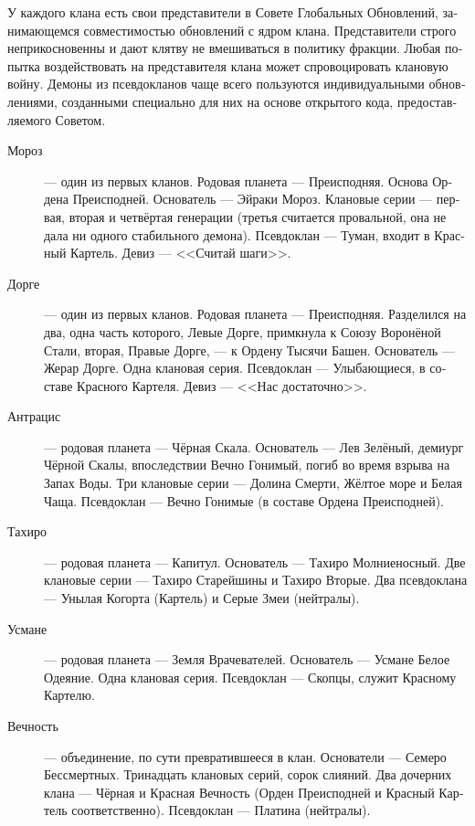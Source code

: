\documentclass[a4paper,12pt,fleqn]{book}\usepackage{cooltooltips}\usepackage{polyglossia}\setdefaultlanguage[babelshorthands=true]{russian}\setotherlanguage{english}\defaultfontfeatures{Ligatures=TeX,Mapping=tex-text} \usepackage{xcolor}\definecolor{lightgray}{HTML}{bbbbbb}\color{lightgray}\newcommand{\ml}[3]{\textenglish{\textcolor{black}{#3}}}
\begin{document}
{У каждого клана есть свои представители в Совете Глобальных Обновлений, занимающемся совместимостью обновлений с ядром клана.
Представители строго неприкосновенны и дают клятву не вмешиваться в политику фракции.
Любая попытка воздействовать на представителя клана может спровоцировать клановую войну.
Демоны из псевдокланов чаще всего пользуются индивидуальными обновлениями, созданными специально для них на основе открытого кода, предоставляемого Советом.

\begin{description}

\item[Мороз] --- один из первых кланов.
Родовая планета --- Преисподняя.
Основа Ордена Преисподней.
Основатель --- Эйраки Мороз.
Клановые серии --- первая, вторая и четвёртая генерации (третья считается провальной, она не дала ни одного стабильного демона).
Псевдоклан --- Туман, входит в Красный Картель.
Девиз --- <<Считай шаги>>.

\item[Дорге] --- один из первых кланов.
Родовая планета --- Преисподняя.
Разделился на два, одна часть которого, Левые Дорге, примкнула к Союзу Воронёной Стали, вторая, Правые Дорге, --- к Ордену Тысячи Башен.
Основатель --- Жерар Дорге.
Одна клановая серия.
Псевдоклан --- Улыбающиеся, в составе Красного Картеля.
Девиз --- <<Нас достаточно>>.

\item[Антрацис] --- родовая планета --- Чёрная Скала.
Основатель --- Лев Зелёный, демиург Чёрной Скалы, впоследствии Вечно Гонимый, погиб во время взрыва на Запах Воды.
Три клановые серии --- Долина Смерти, Жёлтое море и Белая Чаща.
Псевдоклан --- Вечно Гонимые (в составе Ордена Преисподней).

\item[Тахиро] --- родовая планета --- Капитул.
Основатель --- Тахиро Молниеносный.
Две клановые серии --- Тахиро Старейшины и Тахиро Вторые.
Два псевдоклана --- Унылая Когорта (Картель) и Серые Змеи (нейтралы).

\item[Усмане] --- родовая планета --- Земля Врачевателей.
Основатель --- Усмане Белое Одеяние.
Одна клановая серия.
Псевдоклан --- Скопцы, служит Красному Картелю.

\item[Вечность] --- объединение, по сути превратившееся в клан.
Основатели --- Семеро Бессмертных.
Тринадцать клановых серий, сорок слияний.
Два дочерних клана --- Чёрная и Красная Вечность (Орден Преисподней и Красный Картель соответственно).
Псевдоклан --- Платина (нейтралы).


\end{description}}
\end{document}
